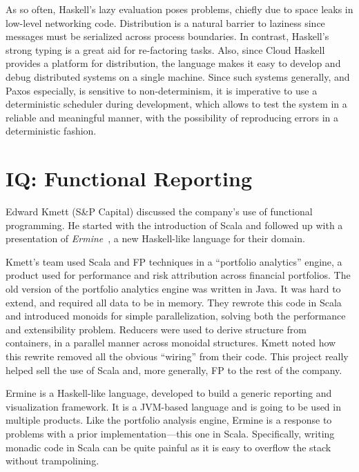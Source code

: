 \documentclass{jfp1}
\begin{document}
As so often, Haskell's lazy evaluation poses problems, chiefly due to space
leaks in low-level networking code. Distribution is a natural barrier to
laziness since messages must be serialized across process boundaries. In
contrast, Haskell's strong typing is a great aid for re-factoring
tasks. Also, since Cloud Haskell provides a platform for distribution, the
language makes it easy to develop and debug distributed systems on a single
machine.  Since such systems generally, and Paxos especially, is sensitive
to non-determinism, it is imperative to use a deterministic scheduler
during development, which allows to test the system in a reliable and
meaningful manner, with the possibility of reproducing errors in a
deterministic fashion. 

\section{IQ: Functional Reporting}


Edward Kmett (S\&P Capital) discussed the company's use of functional
programming. He started with the introduction of Scala and followed up with
a presentation of \textit{Ermine}~\cite{Compall:2014:Ermine}, a new
Haskell-like language for their domain.

Kmett's team used Scala and FP techniques in a ``portfolio analytics''
engine, a product used for performance and risk attribution across
financial portfolios. The old version of the portfolio analytics engine was
written in Java.  It was hard to extend, and required all data to be in
memory. They rewrote this code in Scala and introduced monoids for simple
parallelization, solving both the performance and extensibility problem.
Reducers were used to derive structure from containers, in a parallel
manner across monoidal structures. Kmett noted how this rewrite removed all
the obvious ``wiring'' from their code.  This project really helped sell
the use of Scala and, more generally, FP to the rest of the company.

Ermine is a Haskell-like language, developed to build a generic reporting
and visualization framework. It is a JVM-based language and is going to be
used in multiple products.  Like the portfolio analysis engine, Ermine is a
response to problems with a prior implementation---this one in Scala.
Specifically, writing monadic code in Scala can be quite painful as it is
easy to overflow the stack without trampolining.
\end{document}
